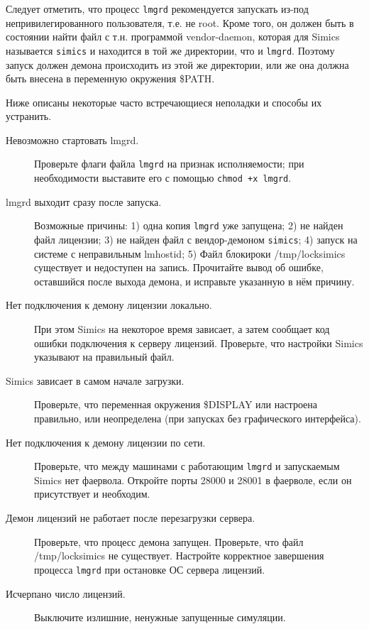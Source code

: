 Следует отметить, что процесс \texttt{lmgrd} рекомендуется запускать из-под непривилегированного пользователя, т.е. не root. Кроме того, он должен быть в состоянии найти файл с т.н. программой vendor-daemon, которая для Simics называется \texttt{simics} и находится в той же директории, что и \texttt{lmgrd}. Поэтому запуск должен демона происходить из этой же директории, или же она должна быть внесена в переменную окружения \$PATH.

Ниже описаны некоторые часто встречающиеся неполадки и способы их устранить.
\begin{description}
    \item[Невозможно стартовать lmgrd.] Проверьте флаги файла \texttt{lmgrd} на признак исполняемости; при необходимости выставите его с помощью \texttt{chmod +x lmgrd}.
    
    \item[lmgrd выходит сразу после запуска.] Возможные причины: 1) одна копия \texttt{lmgrd} уже запущена; 2) не найден файл лицензии; 3) не найден файл с вендор-демоном \texttt{simics}; 4) запуск на системе с неправильным lmhostid; 5) Файл блокироки /tmp/locksimics существует и недоступен на запись. Прочитайте вывод об ошибке, оставшийся после выхода демона, и исправьте указанную в нём причину.

    \item[Нет подключения к демону лицензии локально.] При этом Simics на некоторое время зависает, а затем сообщает код ошибки подключения к серверу лицензий. Проверьте, что настройки Simics указывают на правильный файл.
    
    \item[Simics зависает в самом начале загрузки.] Проверьте, что переменная окружения \$DISPLAY или настроена правильно, или неопределена (при запусках без графического интерфейса).
    
    \item[Нет подключения к демону лицензии по сети.]  Проверьте, что между машинами с работающим \texttt{lmgrd} и запускаемым Simics нет фаервола. Откройте порты 28000 и 28001 в фаерволе, если он присутствует и необходим.
    
    \item[Демон лицензий не работает после перезагрузки сервера.] Проверьте, что процесс демона запущен. Проверьте, что файл /tmp/locksimics не существует. Настройте корректное завершения процесса \texttt{lmgrd} при остановке ОС сервера лицензий.
    
    \item[Исчерпано число лицензий.] Выключите излишние, ненужные запущенные симуляции.
    
\end{description}

